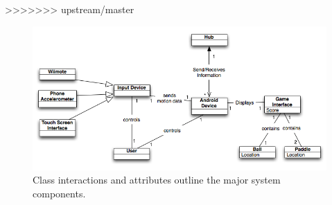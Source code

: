 \documentclass[12pt]{article}
\begin{document}
>>>>>>> upstream/master
\begin{figure}
\begin{center}
\includegraphics[scale=.7]{domainModel_Android-1.png}
\caption{\label{domainModel}Class interactions and attributes outline the major system components.}
\end{center}
\end{figure}


\end{document}
